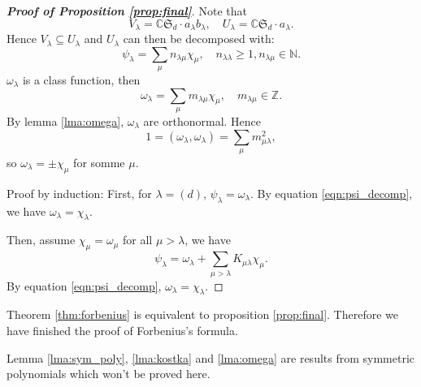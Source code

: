 \documentclass[11pt]{homework}
\begin{document}
\begin{proof}[\normalfont\bfseries Proof of Proposition \ref{prop:final}]
    Note that
    \begin{equation*}
        V_{\lambda} = \mathbb{C} \mathfrak{S}_d \cdot a_\lambda b_\lambda, \quad U_\lambda = \mathbb{C} \mathfrak{S}_d \cdot a_\lambda.
    \end{equation*}
    Hence $V_\lambda \subseteq U_\lambda$ and $U_\lambda$ can then be decomposed with:
    \begin{equation}
        \label{eqn:psi_decomp}
        \psi_\lambda = \sum_{\mu} n_{\lambda \mu} \chi_{\mu}, \quad n_{\lambda \lambda} \geq 1, n_{\lambda \mu} \in \mathbb{N}.
    \end{equation}
    $\omega_\lambda$ is a class function, then
    \begin{equation*}
        \omega_\lambda = \sum_{\mu} m_{\lambda \mu} \chi_{\mu}, \quad  m_{\lambda \mu} \in \mathbb{Z}.
    \end{equation*}
    By lemma \ref{lma:omega}, $\omega_\lambda$ are orthonormal. Hence 
    \begin{equation*}
        1 = (\omega_\lambda, \omega_\lambda) = \sum_{\mu} m_{\mu \lambda}^2,
    \end{equation*}
    so $\omega_\lambda = \pm \chi_\mu$ for somme $\mu$.

    Proof by induction: 
    First, for $\lambda = (d)$, $\psi_\lambda = \omega_\lambda$.
    By equation \ref{eqn:psi_decomp}, we have $\omega_\lambda = \chi_\lambda$.

    Then, assume $\chi_\mu = \omega_\mu$ for all $\mu > \lambda$, we have
    \begin{equation*}
        \psi_\lambda = \omega_\lambda + \sum_{\mu > \lambda} K_{\mu \lambda} \chi_{\mu}.
    \end{equation*}
    By equation \ref{eqn:psi_decomp}, $\omega_\lambda = \chi_\lambda$. 
\end{proof}

Theorem \ref{thm:forbenius} is equivalent to proposition \ref{prop:final}. Therefore we have finished the proof of Forbenius's formula. 

Lemma \ref{lma:sym_poly}, \ref{lma:kostka} and \ref{lma:omega} are results from symmetric polynomials which won't be proved here.
\end{document}
